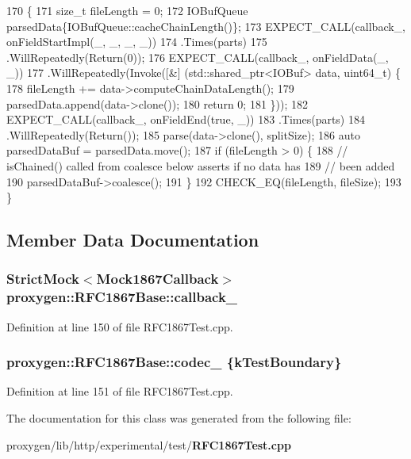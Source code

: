 \begin{DoxyCode}
170                                            \{
171   \textcolor{keywordtype}{size\_t} fileLength = 0;
172   IOBufQueue parsedData\{IOBufQueue::cacheChainLength()\};
173   EXPECT\_CALL(callback_, onFieldStartImpl(\_, \_, \_, \_))
174           .Times(parts)
175           .WillRepeatedly(Return(0));
176   EXPECT\_CALL(callback_, onFieldData(\_, \_))
177     .WillRepeatedly(Invoke([&] (std::shared\_ptr<IOBuf> data, uint64\_t) \{
178           fileLength += data->computeChainDataLength();
179           parsedData.append(data->clone());
180           \textcolor{keywordflow}{return} 0;
181         \}));
182   EXPECT\_CALL(callback_, onFieldEnd(\textcolor{keyword}{true}, \_))
183           .Times(parts)
184           .WillRepeatedly(Return());
185   parse(data->clone(), splitSize);
186   \textcolor{keyword}{auto} parsedDataBuf = parsedData.move();
187   \textcolor{keywordflow}{if} (fileLength > 0) \{
188     \textcolor{comment}{// isChained() called from coalesce below asserts if no data has}
189     \textcolor{comment}{// been added}
190     parsedDataBuf->coalesce();
191   \}
192   CHECK\_EQ(fileLength, fileSize);
193 \}
\end{DoxyCode}


\subsection{Member Data Documentation}
\subsubsection[{callback\+\_\+}]{\setlength{\rightskip}{0pt plus 5cm}Strict\+Mock$<${\bf Mock1867\+Callback}$>$ proxygen\+::\+R\+F\+C1867\+Base\+::callback\+\_\+\hspace{0.3cm}{\ttfamily [protected]}}\label{classproxygen_1_1RFC1867Base_afabcbb3699afee1943b2c909c19787c7}


Definition at line 150 of file R\+F\+C1867\+Test.\+cpp.

\subsubsection[{codec\+\_\+}]{ proxygen\+::\+R\+F\+C1867\+Base\+::codec\+\_\+ \{k\+Test\+Boundary\}\hspace{0.3cm}{\ttfamily [protected]}}\label{classproxygen_1_1RFC1867Base_ad7b71eda83158917ec128fad2d0d7553}


Definition at line 151 of file R\+F\+C1867\+Test.\+cpp.



The documentation for this class was generated from the following file\+:\begin{DoxyCompactItemize}
\item 
proxygen/lib/http/experimental/test/{\bf R\+F\+C1867\+Test.\+cpp}\end{DoxyCompactItemize}
